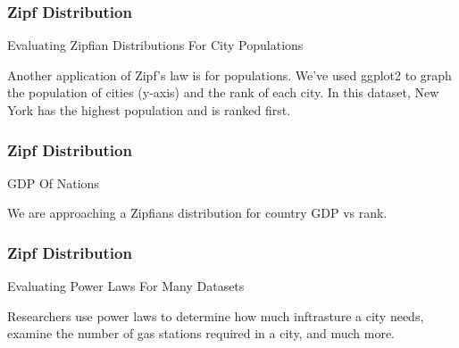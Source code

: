\documentclass{beamer}
\begin{document}
\begin{frame}
\frametitle{Zipf Distribution}




Evaluating Zipfian Distributions For City Populations



Another application of Zipf’s law is for populations. 
We’ve used ggplot2 to graph the population of cities (y-axis) and the rank of each city. 
In this dataset, New York has the highest population and is ranked first. 


\end{frame}

\begin{frame}
\frametitle{Zipf Distribution}



GDP Of Nations



We are approaching a Zipfians distribution for country GDP vs rank. 


\end{frame}

\begin{frame}
\frametitle{Zipf Distribution}



Evaluating Power Laws For Many Datasets



Researchers use power laws to determine how much inftrasture a city needs, examine the number of gas stations required in a city, and much more. 



\end{frame}
\end{document}
